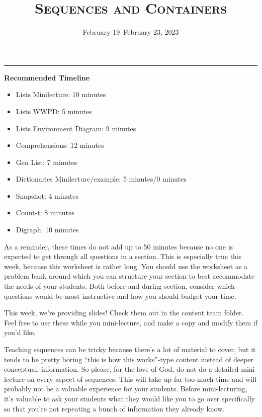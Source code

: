 \documentclass{exam}
\title{\textsc{Sequences and Containers}}
\date{February 19--February 23, 2023}
\begin{document}
\maketitle
\rule{\textwidth}{0.15em}


\begin{meta}
    \textbf{Recommended Timeline}
    \begin{itemize}
        \item Lists Minilecture: 10 minutes
        \item Lists WWPD: 5 minutes
        \item Lists Environment Diagram: 9 minutes
        \item Comprehensions: 12 minutes
        \item Gen List: 7 minutes
        \item Dictionaries Minilecture/example: 5 minutes/0 minutes
        \item Snapshot: 4 minutes
        \item Count-t: 8 minutes
        \item Digraph: 10 minutes
    \end{itemize}

    As a reminder, these times do not add up to 50 minutes because no one is expected 
    to get through all questions in a section. This is especially true this week, 
    because this worksheet is rather long. You should use the worksheet as a problem bank
     around which you can structure your section to best accommodate the needs of your 
     students. Both before and during section, consider which questions would be most 
     instructive and how you should budget your time.

    This week, we're providing slides! Check them out in the content team folder. 
    Feel free to use these while you mini-lecture, and make a copy and modify them 
    if you'd like. 

    Teaching sequences can be tricky because there's a lot of material to cover, but 
    it tends to be pretty boring ``this is how this works''-type content instead of 
    deeper conceptual, information. So please, for the love of God, do not do a detailed 
    mini-lecture on every aspect of sequences. This will take up far too much time and 
    will probably not be a valuable experience for your students. Before mini-lecturing, 
    it's valuable to ask your students what they would like you to go over specifically 
    so that you're not repeating a bunch of information they already know. 
\end{meta}
\end{document}
